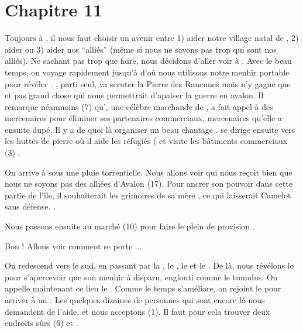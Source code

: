 \documentclass[11pt]{article}
\begin{document}
{%
\section{Chapitre 11}

Toujours à \longcairn{}, il nous faut choisir un avenir entre 1) aider notre village natal de \cuanacht{}, 2) aider \newcamelot{} ou 3) aider nos ``alliés'' (même si nous ne savons pas trop qui sont nos alliés). Ne sachant pas trop que faire, nous décidons d'aller voir \mordred{} à \nidcorbeaux{}. Avec le beau temps, on voyage rapidement jusqu'à \croisee{} d'où nous utilisons notre menhir portable pour révéler \nidcorbeaux{}. \beor{}, parti seul, va scruter la Pierre des Rancunes mais n'y gagne que \gain{\terror[1]} et pas grand chose qui nous permettrait d'apaiser la guerre en avalon. Il remarque néanmoins (7) qu'\aelisa{}, une célèbre marchande de \boismuraille{}, a fait appel à des mercenaires pour éliminer ses partenaires commerciaux, mercenaires qu'elle a ensuite dupé. Il y a de quoi là organiser un beau chantage . \beor{} se dirige ensuite vers les huttes de pierre où il aide les réfugiés (\gain{\rep[5], \rich[-5]} et visite les bâtiments commerciaux (3) \gain{\rich[1], \nrj[-1]}.

On arrive à \nidcorbeaux{} sous une pluie torrentielle. Nous allons voir \mordred{} qui nous reçoit bien que nous ne soyons pas des alliées d'Avalon (17). Pour ancrer son pouvoir dans cette partie de l'île, il souhaiterait les grimoires de sa mère \morgane{}, ce qui laisserait Camelot sans défense. .


Nous passons ensuite au marché (10) pour faire le plein de provision \gain{\rich[-1], \nour[1]}.

Bon ! Allons voir comment se porte \cuanacht{}...

On redescend vers le sud, en passant par la \croisee{}, le \cerclelunaire{}, le \visageserein{} et le \valsanglant{}. De là, nous révélons le \tumulus{} pour s'apercevoir que son menhir à disparu, englouti comme le tumulus. On appelle maintenant ce lieu le \tumulusengloutis{} . Comme le temps s'améliore, on rejoint le \bosquet{} pour arriver à un \cuanachtdevaste{}. Les quelques dizaines de personnes qui sont encore là nous demandent de l'aide, et nous acceptons (1). Il faut pour cela trouver deux endroits sûrs (6) et  .

}
\end{document}
